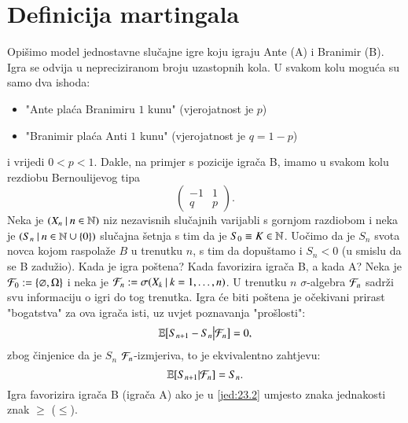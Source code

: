 
\chapter{Definicija martingala}

\begin{pr}  \label{pr:23.1}
    Opi\v simo model jednostavne slu\v cajne igre koju igraju Ante (A) i Branimir (B).
    Igra se odvija u nepreciziranom broju uzastopnih kola.
    U svakom kolu mogu\' ca su samo dva ishoda:
    \begin{itemize}
        \item[] "Ante pla\' ca Branimiru $1$ kunu" (vjerojatnost je $p$)
        \item[] "Branimir pla\' ca Anti $1$ kunu" (vjerojatnost je $q = 1 - p$) 
    \end{itemize}
    i vrijedi $0 < p < 1$.
    Dakle, na primjer s pozicije igra\v ca B, imamo u svakom kolu rezdiobu Bernoulijevog tipa
    \begin{equation*}
        \begin{pmatrix}
            -1& 1\\
            q& p
        \end{pmatrix}.
    \end{equation*}
    Neka je $({X_n} \: | \: {n \in \mathbb{N}})$ niz nezavisnih slu\v cajnih varijabli s gornjom razdiobom i neka je $({S_n} \: | \: {n \in \mathbb{N} \cup \{0\}})$ slu\v cajna \v setnja s tim da je $S_0 \equiv K \in \mathbb{N}$.
    Uo\v cimo da je $S_n$ svota novca kojom raspola\v ze $B$ u trenutku $n$, s tim da dopu\v stamo i $S_n < 0$ (u smislu da se B zadu\v zio).
    Kada je igra po\v stena?
    Kada favorizira igra\v ca B, a kada A?
    Neka je $\mathcal{F}_0 := \{ \varnothing, \Omega \}$ i neka je $\mathcal{F}_n := \sigma({X_k} \: | \: {k = 1, \ldots, n})$.
    U trenutku $n$ $\sigma$-algebra $\mathcal{F}_n$ sadr\v zi svu informaciju o igri do tog trenutka.
    Igra \' ce biti po\v stena je o\v cekivani prirast "bogatstva" za ova igra\v ca isti, uz uvjet poznavanja "pro\v slosti":
    \begin{equation*}
        \mathbb{E} \big[ S_{n + 1} - S_n \big| \mathcal{F}_n \big] = 0,
    \end{equation*}
    zbog \v cinjenice da je $S_n$ $\mathcal{F}_n$-izmjeriva, to je ekvivalentno zahtjevu:
    \begin{equation}    \label{jed:23.2}
        \mathbb{E} [S_{n + 1} | \mathcal{F}_n] = S_n.
    \end{equation}
    Igra favorizira igra\v ca B (igra\v ca A) ako je u \eqref{jed:23.2} umjesto znaka jednakosti znak $\geq$ ($\leq$).

\end{pr}
